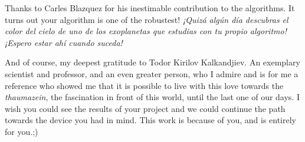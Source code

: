 \documentclass[11pt, a4paper, twoside]{article} %
\begin{document}
Thanks to Carles Blazquez for his inestimable contribution to the algorithms. It turns out your algorithm is one of the robustest! {\em ¡Quizá algún día descubras el color del cielo de uno de los exoplanetas que estudias con tu propio algoritmo! ¡Espero estar ahí cuando suceda!}

And of course, my deepest gratitude to Todor Kirilov Kalkandjiev. An exemplary scientist and professor, and an even greater person, who I admire and is for me a reference who showed me that it is possible to live with this love towards the {\em thaumazein}, the fascination in front of this world, until the last one of our days. I wish you could see the results of your project and we could continue the path towards the device you had in mind. This work is because of you, and is entirely for you.\vspace{0.1cm};)



\newpage

\fancyhead[OR]{ }

\fancyhead[EL]{\em }

\newpage
\fancyhead[OL]{}
\fancyhead[OR]{}
\fancyhead[EL]{}
\fancyhead[ER]{}
\end{document}
